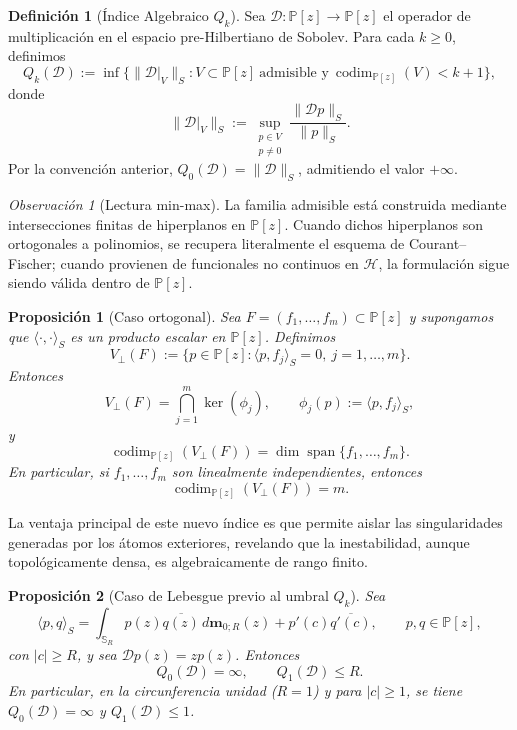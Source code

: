 \documentclass[12pt,a4paper]{article}
\newtheorem{proposition}{Proposición}
\theoremstyle{definition}
\newtheorem{definition}{Definición}
\theoremstyle{remark}
\newtheorem{remark}{Observación}
\newcommand{\Poly}{\mathbb{P}[z]}
\newcommand{\D}{\mathcal{D}}
\begin{document}
\begin{definition}[Índice Algebraico $Q_k$]\label{def:indice_Qk}
  Sea $\D:\Poly\to\Poly$ el operador de multiplicación en el espacio pre-Hilbertiano de Sobolev. Para cada $k\ge0$, definimos
  \[
    Q_k(\D)
    :=\inf\{\|\D|_V\|_S:V\subset\Poly\ \text{admisible y}\ \operatorname{codim}_{\Poly}(V)<k+1\},
  \]
  donde
  \[
    \|\D|_V\|_S:=\sup_{\substack{p\in V\\p\ne0}}\frac{\|\D p\|_S}{\|p\|_S}.
  \]
  Por la convención anterior, $Q_0(\D)=\|\D\|_S$, admitiendo el valor $+\infty$.
\end{definition}

\begin{remark}[Lectura min-max]
  La familia admisible está construida mediante intersecciones finitas de hiperplanos en $\Poly$. Cuando dichos hiperplanos son ortogonales a polinomios, se recupera literalmente el esquema de Courant--Fischer; cuando provienen de funcionales no continuos en $\mathcal{H}$, la formulación sigue siendo válida dentro de $\Poly$.
\end{remark}

\begin{proposition}[Caso ortogonal]\label{prop:equiv_ortho_interseccion}
  Sea $F=(f_1,\dots,f_m)\subset \Poly$ y supongamos que
  $\langle\cdot,\cdot\rangle_S$ es un producto escalar en $\Poly$.
  Definimos
  \[
    V_{\perp}(F):=\{p\in\Poly:\langle p,f_j\rangle_S=0,\ j=1,\dots,m\}.
  \]
  Entonces
  \[
    V_{\perp}(F)=\bigcap_{j=1}^m \ker(\phi_j),
    \qquad
    \phi_j(p):=\langle p,f_j\rangle_S,
  \]
  y
  \[
    \operatorname{codim}_{\Poly}(V_\perp(F))
    =
    \dim\operatorname{span}\{f_1,\dots,f_m\}.
  \]
  En particular, si $f_1,\dots,f_m$ son linealmente independientes, entonces
  \[
    \operatorname{codim}_{\Poly}(V_\perp(F))=m.
  \]
\end{proposition}

La ventaja principal de este nuevo índice es que permite aislar las singularidades generadas por los átomos exteriores, revelando que la inestabilidad, aunque topológicamente densa, es algebraicamente de rango finito.

\begin{proposition}[Caso de Lebesgue previo al umbral $Q_k$]
  \label{prop:lebesgue_pre_umbral_Qk}
  Sea
  \[
    \langle p,q\rangle_S
    =
    \int_{\mathbb{S}_R} p(z)\overline{q(z)}\,d\mathbf m_{0;R}(z)
    +
    p'(c)\overline{q'(c)},
    \qquad p,q\in\Poly,
  \]
  con $|c|\ge R$, y sea $\D p(z)=zp(z)$. Entonces
  \[
    Q_0(\D)=\infty,
    \qquad
    Q_1(\D)\le R.
  \]
  En particular, en la circunferencia unidad ($R=1$) y para $|c|\ge1$, se tiene
  $Q_0(\D)=\infty$ y $Q_1(\D)\le1$.
\end{proposition}
\end{document}
